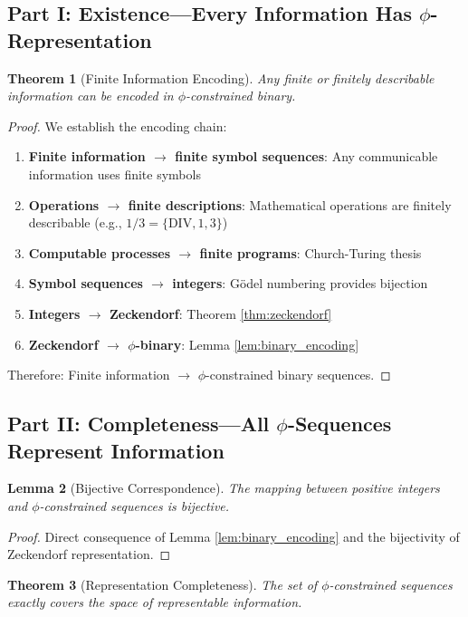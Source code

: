 \documentclass[12pt,letterpaper]{article}
\newtheorem{theorem}{Theorem}[section]
\newtheorem{lemma}[theorem]{Lemma}
\begin{document}
\subsection{Part I: Existence—Every Information Has $\phi$-Representation}

\begin{theorem}[Finite Information Encoding]
\label{thm:finite_encoding}
Any finite or finitely describable information can be encoded in $\phi$-constrained binary.
\end{theorem}

\begin{proof}
We establish the encoding chain:
\begin{enumerate}
\item \textbf{Finite information $\to$ finite symbol sequences}: Any communicable information uses finite symbols
\item \textbf{Operations $\to$ finite descriptions}: Mathematical operations are finitely describable (e.g., $1/3 = \{\text{DIV}, 1, 3\}$)
\item \textbf{Computable processes $\to$ finite programs}: Church-Turing thesis
\item \textbf{Symbol sequences $\to$ integers}: Gödel numbering provides bijection
\item \textbf{Integers $\to$ Zeckendorf}: Theorem \ref{thm:zeckendorf}
\item \textbf{Zeckendorf $\to$ $\phi$-binary}: Lemma \ref{lem:binary_encoding}
\end{enumerate}

Therefore: Finite information $\to$ $\phi$-constrained binary sequences.
\end{proof}

\subsection{Part II: Completeness—All $\phi$-Sequences Represent Information}

\begin{lemma}[Bijective Correspondence]
The mapping between positive integers and $\phi$-constrained sequences is bijective.
\end{lemma}

\begin{proof}
Direct consequence of Lemma \ref{lem:binary_encoding} and the bijectivity of Zeckendorf representation.
\end{proof}

\begin{theorem}[Representation Completeness]
The set of $\phi$-constrained sequences exactly covers the space of representable information.
\end{theorem}
\end{document}
